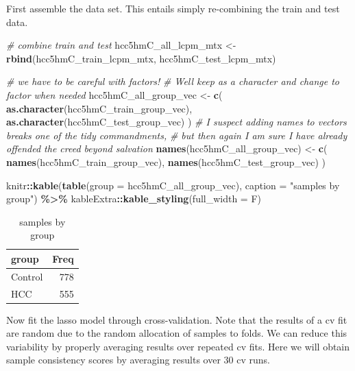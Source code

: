 \documentclass[
]{book}
\newenvironment{Shaded}{\begin{snugshade}}{\end{snugshade}}
\newcommand{\CommentTok}[1]{\textcolor[rgb]{0.56,0.35,0.01}{\textit{#1}}}
\newcommand{\DataTypeTok}[1]{\textcolor[rgb]{0.13,0.29,0.53}{#1}}
\newcommand{\KeywordTok}[1]{\textcolor[rgb]{0.13,0.29,0.53}{\textbf{#1}}}
\newcommand{\NormalTok}[1]{#1}
\newcommand{\OperatorTok}[1]{\textcolor[rgb]{0.81,0.36,0.00}{\textbf{#1}}}
\newcommand{\StringTok}[1]{\textcolor[rgb]{0.31,0.60,0.02}{#1}}
\begin{document}
First assemble the data set. This entails simply re-combining the
train and test data.

\begin{Shaded}
\begin{Highlighting}[]
\CommentTok{\# combine train and test }
\NormalTok{hcc5hmC\_all\_lcpm\_mtx <{-}}\StringTok{ }\KeywordTok{rbind}\NormalTok{(hcc5hmC\_train\_lcpm\_mtx, hcc5hmC\_test\_lcpm\_mtx)}

\CommentTok{\# we have to be careful with factors!}
\CommentTok{\# We\textquotesingle{}ll keep as a character and change to factor when needed}
\NormalTok{hcc5hmC\_all\_group\_vec <{-}}\StringTok{ }\KeywordTok{c}\NormalTok{(}
 \KeywordTok{as.character}\NormalTok{(hcc5hmC\_train\_group\_vec), }
 \KeywordTok{as.character}\NormalTok{(hcc5hmC\_test\_group\_vec)}
\NormalTok{)}
\CommentTok{\# I suspect adding names to vectors breaks one of the tidy commandments,}
\CommentTok{\# but then again I am sure I have already offended the creed beyond salvation}
\KeywordTok{names}\NormalTok{(hcc5hmC\_all\_group\_vec) <{-}}\StringTok{ }\KeywordTok{c}\NormalTok{(}
 \KeywordTok{names}\NormalTok{(hcc5hmC\_train\_group\_vec),}
 \KeywordTok{names}\NormalTok{(hcc5hmC\_test\_group\_vec)}
\NormalTok{)}

\NormalTok{knitr}\OperatorTok{::}\KeywordTok{kable}\NormalTok{(}\KeywordTok{table}\NormalTok{(}\DataTypeTok{group =}\NormalTok{ hcc5hmC\_all\_group\_vec),}
  \DataTypeTok{caption =} \StringTok{"samples by group"}\NormalTok{) }\OperatorTok{\%>\%}
\StringTok{   }\NormalTok{kableExtra}\OperatorTok{::}\KeywordTok{kable\_styling}\NormalTok{(}\DataTypeTok{full\_width =}\NormalTok{ F)}
\end{Highlighting}
\end{Shaded}

\begin{table}

\caption{\label{tab:hcc5hmC-glmnetSuite-get-all-data}samples by group}
\centering
\begin{tabular}[t]{l|r}
\hline
group & Freq\\
\hline
Control & 778\\
\hline
HCC & 555\\
\hline
\end{tabular}
\end{table}

Now fit the lasso model through cross-validation.
Note that the results of a cv fit are random due to the
random allocation of samples to folds. We can reduce this
variability by properly averaging results over repeated cv fits.
Here we will obtain sample consistency scores by averaging results
over 30 cv runs.
\end{document}
